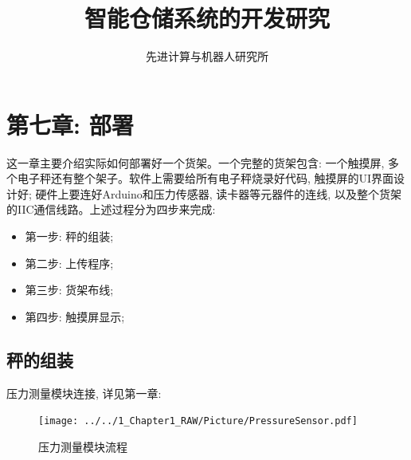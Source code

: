 \documentclass{article}
\newcommand{\xiaosihao}{\fontsize{12pt}{\baselineskip}\selectfont}
\begin{document}
	
\newtheorem{example}{例}             %
\newtheorem{algorithm}{算法}
\newtheorem{theorem}{定理}[section]  %
\newtheorem{definition}{定义}
\newtheorem{axiom}{公理}
\newtheorem{property}{性质}
\newtheorem{proposition}{命题}
\newtheorem{lemma}{引理}
\newtheorem{corollary}{推论}
\newtheorem{remark}{注解}
\newtheorem{condition}{条件}
\newtheorem{conclusion}{结论}
\newtheorem{assumption}{假设}

\renewcommand{\contentsname}{目录}  %
\renewcommand{\abstractname}{摘要}  %
\renewcommand{\refname}{参考文献}   %
\renewcommand{\indexname}{索引}
\renewcommand{\figurename}{图}
\renewcommand{\tablename}{表}
\renewcommand{\appendixname}{附录}
\renewcommand{\algorithm}{算法}	

\title{智能仓储系统的开发研究}
\author{\xiaosihao 先进计算与机器人研究所}
		
\maketitle
		
\tableofcontents
\newpage

\section{第七章: 部署}
这一章主要介绍实际如何部署好一个货架。一个完整的货架包含: 一个触摸屏, 多个电子秤还有整个架子。软件上需要给所有电子秤烧录好代码, 触摸屏的UI界面设计好; 
硬件上要连好Arduino和压力传感器, 读卡器等元器件的连线, 以及整个货架的IIC通信线路。上述过程分为四步来完成:
\begin{itemize}
  \item 第一步: 秤的组装;
  \item 第二步: 上传程序;
  \item 第三步: 货架布线;
  \item 第四步: 触摸屏显示;
\end{itemize}

\subsection{秤的组装}
压力测量模块连接, 详见第一章:
\begin{figure}[h]
	\centering
	\texttt{[image: ../../1\_Chapter1\_RAW/Picture/PressureSensor.pdf]}
	\caption{压力测量模块流程}
	\label{fig:压力测量模块流程图}
	\hfill
\end{figure}
		
\end{document}
